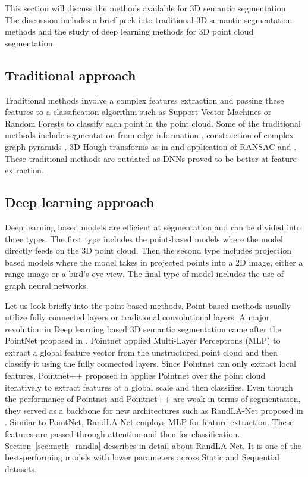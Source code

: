     This section will discuss the methods available for 3D semantic segmentation.
    The discussion includes a brief peek into traditional 3D semantic segmentation methods and the study of deep learning methods for 3D point cloud segmentation.

\subsection{Traditional approach}
Traditional methods involve a complex features extraction and passing these features to a classification algorithm such as Support Vector Machines or Random Forests to classify each point in the point cloud.
Some of the traditional methods include segmentation from edge information \cite{bhanu1986range}, construction of complex graph pyramids \cite{koster}.
3D Hough transforms as in \cite{vosselman20013d} and application of RANSAC \cite{schnabel2007efficient} and \cite{tarsha2007hough}.
These traditional methods are outdated as DNNs proved to be better at feature extraction.

\subsection{Deep learning approach}
\label{sec:dl_approach}
Deep learning based models are efficient at segmentation and can be divided into three types.
The first type includes the point-based models where the model directly feeds on the 3D point cloud.
Then the second type includes projection based models where the model takes in projected points into a 2D image, either a range image or a bird's eye view.
The final type of model includes the use of graph neural networks.

Let us look briefly into the point-based methods. Point-based methods usually utilize fully connected layers or traditional convolutional layers.
A major revolution in Deep learning based 3D semantic segmentation came after the PointNet proposed in \cite{Qi_2017_CVPR_pointnet}.
Pointnet applied Multi-Layer Perceptrons (MLP) to extract a global feature vector from the unstructured point cloud and then classify it using the fully connected layers.
Since Pointnet can only extract local features, Pointnet++ proposed in \cite{qi2017pointnet++} applies Pointnet over the point cloud iteratively to extract features at a global scale and then classifies.
Even though the performance of Pointnet and Pointnet++ are weak in terms of segmentation, they served as a backbone for new architectures such as RandLA-Net proposed in \cite{Hu_2020_CVPR_Randla}.
Similar to PointNet, RandLA-Net employs MLP for feature extraction. These features are passed through attention and then for classification.
 Section~\ref{sec:meth_randla} describes in detail about RandLA-Net.
It is one of the best-performing models with lower parameters across Static and Sequential datasets.

